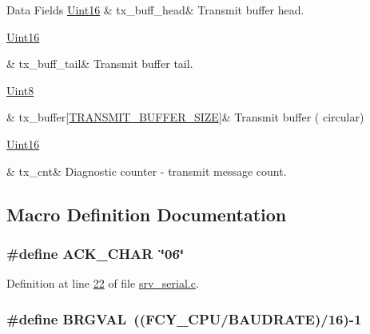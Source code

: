 \begin{DoxyFields}{Data Fields}
\hypertarget{a00030_a3e2eda0a020422511de91b2bc7386083}{\hyperlink{a00072_a59a9f6be4562c327cbfb4f7e8e18f08b}{Uint16}}\label{a00030_a3e2eda0a020422511de91b2bc7386083}
&
tx\+\_\+buff\+\_\+head&
Transmit buffer head. \\
\hline

\hypertarget{a00030_a6287e1447d7902b8bbc2f6359065dcbd}{\hyperlink{a00072_a59a9f6be4562c327cbfb4f7e8e18f08b}{Uint16}}\label{a00030_a6287e1447d7902b8bbc2f6359065dcbd}
&
tx\+\_\+buff\+\_\+tail&
Transmit buffer tail. \\
\hline

\hypertarget{a00030_a327864d2719b5145f0eded883fe321c5}{\hyperlink{a00072_af84840501dec18061d18a68c162a8fa2}{Uint8}}\label{a00030_a327864d2719b5145f0eded883fe321c5}
&
tx\+\_\+buffer\mbox{[}\hyperlink{a00031_aef714b16a48390956c10e8aa18d156b8}{T\+R\+A\+N\+S\+M\+I\+T\+\_\+\+B\+U\+F\+F\+E\+R\+\_\+\+S\+I\+Z\+E}\mbox{]}&
Transmit buffer ( circular) \\
\hline

\hypertarget{a00030_ab6b71c720d341035fb26d723364eb879}{\hyperlink{a00072_a59a9f6be4562c327cbfb4f7e8e18f08b}{Uint16}}\label{a00030_ab6b71c720d341035fb26d723364eb879}
&
tx\+\_\+cnt&
Diagnostic counter -\/ transmit message count. \\
\hline

\end{DoxyFields}


\subsection{Macro Definition Documentation}
\hypertarget{a00030_a2c59f95209427bfe2c53a30515cfbeda}{
\subsubsection[{A\+C\+K\+\_\+\+C\+H\+A\+R}]{\setlength{\rightskip}{0pt plus 5cm}\#define A\+C\+K\+\_\+\+C\+H\+A\+R~\char`\"{}06\char`\"{}}}\label{a00030_a2c59f95209427bfe2c53a30515cfbeda}


Definition at line \hyperlink{a00030_source_l00022}{22} of file \hyperlink{a00030_source}{srv\+\_\+serial.\+c}.

\hypertarget{a00030_aca346e181d2ffc089e22e75736a6ff63}{
\subsubsection[{B\+R\+G\+V\+A\+L}]{\setlength{\rightskip}{0pt plus 5cm}\#define B\+R\+G\+V\+A\+L~(({\bf F\+C\+Y\+\_\+\+C\+P\+U}/{\bf B\+A\+U\+D\+R\+A\+T\+E})/16)-\/1}}\label{a00030_aca346e181d2ffc089e22e75736a6ff63}


